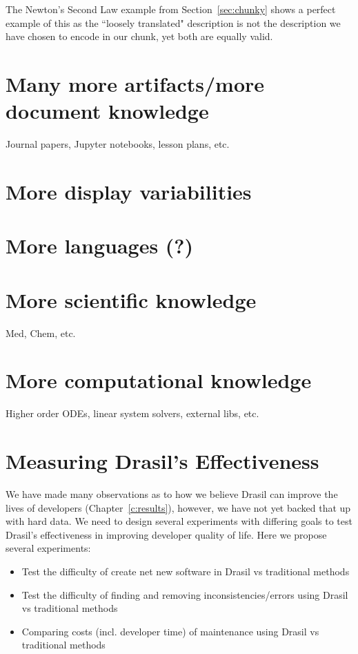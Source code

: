 The Newton's Second Law example from Section~\ref{sec:chunky} shows a perfect 
example of this as the ``loosely translated" description is not the description 
we have chosen to encode in our chunk, yet both are equally valid.

\section{Many more artifacts/more document knowledge}

Journal papers, Jupyter notebooks, lesson plans, etc.

\section{More display variabilities}

\section{More languages (?)}

\section{More scientific knowledge}

Med, Chem, etc.

\section{More computational knowledge}

Higher order ODEs, linear system solvers, external libs, etc.


\section{Measuring Drasil's Effectiveness}

We have made many observations as to how we believe Drasil can improve the 
lives of developers (Chapter~\ref{c:results}), however, we have not yet backed 
that up with hard data. We need to design several experiments with differing 
goals to test Drasil's effectiveness in improving developer quality of life. 
Here we propose several experiments:

\begin{itemize}
\item Test the difficulty of create net new software in Drasil vs traditional 
methods
\item Test the difficulty of finding and removing inconsistencies/errors using 
Drasil vs traditional methods
\item Comparing costs (incl. developer time) of maintenance using Drasil vs 
traditional methods
\end{itemize}

